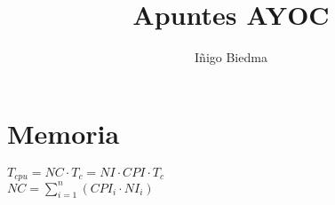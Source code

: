 \documentclass[10pt,a4paper]{article}
\author{Iñigo Biedma}
\title{Apuntes AYOC}
\begin{document}
\section{Memoria}
$T_{cpu}=NC\cdot T_c=NI\cdot CPI\cdot T_c$\\
$NC=\sum_{i=1}^n(CPI_i\cdot NI_i)$
\end{document}
